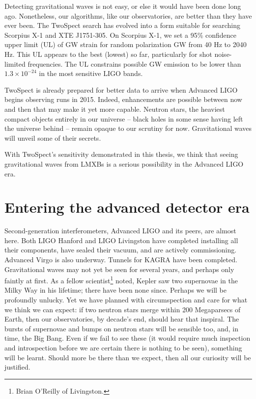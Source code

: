 Detecting gravitational waves is not easy, or else it would have been done long ago.
Nonetheless, our algorithms, like our observatories, are better than they have ever been.
The TwoSpect search has evolved into a form suitable for searching Scorpius X-1 and XTE J1751-305.
On Scorpius X-1, we set a 95\% confidence upper limit (UL) of GW strain for random polarization GW from 40 Hz to 2040 Hz.
This UL appears to the best (lowest) so far, particularly for shot noise-limited frequencies.
The UL constrains possible GW emission to be lower than $1.3\times10^{-24}$ in the most sensitive LIGO bands.

TwoSpect is already prepared for better data to arrive when Advanced LIGO begins observing runs in 2015.
Indeed, enhancements are possible between now and then that may make it yet more capable.
Neutron stars, the heaviest compact objects entirely in our universe -- black holes in some sense having left the universe behind -- remain opaque to our scrutiny for now.
Gravitational waves will unveil some of their secrets.

With TwoSpect's sensitivity demonstrated in this thesis, we think that seeing gravitational waves from LMXBs is a serious possibility in the Advanced LIGO era.


    \section{Entering the advanced detector era}
    \label{advanced_detector_era}


Second-generation interferometers, Advanced LIGO and its peers, are almost here. 
Both LIGO Hanford and LIGO Livingston have completed installing all their components, have sealed their vacuum, and are actively commissioning.
Advanced Virgo is also underway.
Tunnels for KAGRA have been completed.
Gravitational waves may not yet be seen for several years, and perhaps only faintly at first.
As a fellow scientist\footnote{Brian O'Reilly of Livingston.} noted, Kepler saw two supernovae in the Milky Way in his lifetime; there have been none since.
Perhaps we will be profoundly unlucky.
Yet we have planned with circumspection and care for what we think we can expect: if two neutron stars merge within 200 Megaparsecs of Earth, then our observatories, by decade's end, should hear that inspiral.
The bursts of supernovae and bumps on neutron stars will be sensible too, and, in time, the Big Bang.
Even if we fail to see these (it would require much inspection and introspection before we are certain there is nothing to be seen), something will be learnt.
Should more be there than we expect, then all our curiosity will be justified.

